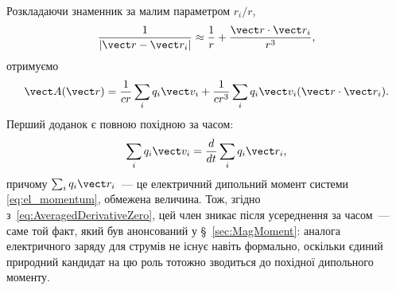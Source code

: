 Розкладаючи знаменник за малим параметром $r_i/r$,
\begin{equation*}
	\frac{1}{|\vect r-\vect r_i|} \approx \frac{1}{r} + \frac{\vect r\cdot\vect r_i}{r^3},
\end{equation*}
отримуємо
\begin{equation}\label{eq:VectorPotentialTwoTerms}
	\vect A(\vect r) = \frac{1}{cr}\sum_i q_i\vect v_i + \frac{1}{cr^3}\sum_i q_i\vect v_i(\vect r\cdot\vect r_i).
\end{equation}
Перший доданок є повною похідною за часом:
\begin{equation*}
	\sum_i q_i\vect v_i = \frac{d}{dt}\sum_i q_i\vect r_i,
\end{equation*}
причому $\sum_i q_i\vect r_i$~--- це електричний дипольний момент системи
\eqref{eq:el_momentum}, обмежена величина. Тож, згідно
з~\eqref{eq:AveragedDerivativeZero}, цей член зникає після усереднення за часом~--- саме
той факт, який був анонсований у §~\ref{sec:MagMoment}: аналога електричного заряду для
струмів не існує навіть формально, оскільки єдиний природний кандидат на цю роль тотожно
зводиться до похідної дипольного моменту.

